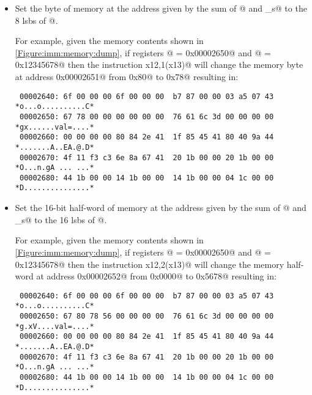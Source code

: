 \begin{figure}[ht]
\centering
\DrawInsnOpSTypeDecoding
{}
\label{Figure:imm_s_type_decode}
\label{imm.s:decode}
\end{figure}

\begin{itemize}
\item{}
\label{insn:sb}

Set the byte of memory at the address given by the sum of @ and 
\verb@imm_s@ to the 8 \acrshort{lsb}s of @.

For example, given the memory contents shown in \autoref{Figure:imm:memory:dump},
if registers @ = \verb@0x00002650@ and @ = \verb@0x12345678@
then the instruction \verb@sb x12,1(x13)@ will change the memory byte at address 
\verb@0x00002651@ from \verb@0x80@ to \verb@0x78@ resulting in:

\begin{verbatim}
 00002640: 6f 00 00 00 6f 00 00 00  b7 87 00 00 03 a5 07 43 *o...o..........C*
 00002650: 67 78 00 00 00 00 00 00  76 61 6c 3d 00 00 00 00 *gx......val=....*
 00002660: 00 00 00 00 80 84 2e 41  1f 85 45 41 80 40 9a 44 *.......A..EA.@.D*
 00002670: 4f 11 f3 c3 6e 8a 67 41  20 1b 00 00 20 1b 00 00 *O...n.gA ... ...*
 00002680: 44 1b 00 00 14 1b 00 00  14 1b 00 00 04 1c 00 00 *D...............*
\end{verbatim}

\item{}
\label{insn:sh}

Set the 16-bit half-word of memory at the address given by the sum of @ and 
\verb@imm_s@ to the 16 \acrshort{lsb}s of @.

For example, given the memory contents shown in \autoref{Figure:imm:memory:dump},
if registers @ = \verb@0x00002650@ and @ = \verb@0x12345678@
then the instruction \verb@sh x12,2(x13)@ will change the memory half-word at 
address \verb@0x00002652@ from \verb@0x0000@ to \verb@0x5678@ resulting in:

\begin{verbatim}
 00002640: 6f 00 00 00 6f 00 00 00  b7 87 00 00 03 a5 07 43 *o...o..........C*
 00002650: 67 80 78 56 00 00 00 00  76 61 6c 3d 00 00 00 00 *g.xV....val=....*
 00002660: 00 00 00 00 80 84 2e 41  1f 85 45 41 80 40 9a 44 *.......A..EA.@.D*
 00002670: 4f 11 f3 c3 6e 8a 67 41  20 1b 00 00 20 1b 00 00 *O...n.gA ... ...*
 00002680: 44 1b 00 00 14 1b 00 00  14 1b 00 00 04 1c 00 00 *D...............*
\end{verbatim}


\end{itemize}
